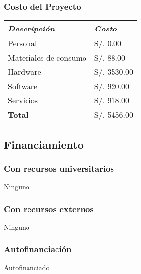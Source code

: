     \subsubsection{Costo del Proyecto}
        \begin{table}[h!]
            \centering
            \begin{tabular}{|p{5cm}|p{4cm}|} \hline


                \textit{{\bf{Descripción}}} &
                \textit{{\bf{Costo}}}
                \\ \hline

                Personal &
                S/. 0.00
                \\ \hline

                Materiales de consumo &
                S/. 88.00
                \\ \hline

                Hardware &
                S/. 3530.00
                \\ \hline

                Software &
                S/. 920.00
                \\ \hline

                Servicios &
                S/. 918.00
                \\ \hline

                \bf{Total} &
                S/. 5456.00
                \\ \hline

            \end{tabular}
        \end{table}

\subsection{Financiamiento}
    \subsubsection{Con recursos universitarios}
        Ninguno
    \subsubsection{Con recursos externos}
        Ninguno
    \subsubsection{Autofinanciación}
        Autofinanciado
